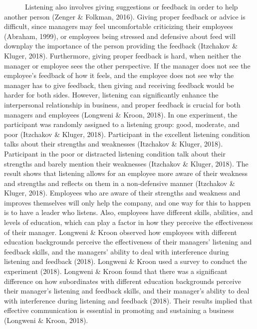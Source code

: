 \documentclass[
  12pt,
]{article}
\begin{document}
~~~~~~Listening also involves giving suggestions or feedback in order to help another person (Zenger \& Folkman, 2016). Giving proper feedback or advice is difficult, since managers may feel uncomfortable criticizing their employees (Abraham, 1999), or employees being stressed and defensive about feed will downplay the importance of the person providing the feedback (Itzchakov \& Kluger, 2018). Furthermore, giving proper feedback is hard, when neither the manager or employee sees the other perspective. If the manager does not see the employee's feedback of how it feels, and the employee does not see why the manager has to give feedback, then giving and receiving feedback would be harder for both sides. However, listening can significantly enhance the interpersonal relationship in business, and proper feedback is crucial for both managers and employees (Longweni \& Kroon, 2018). In one experiment, the participant was randomly assigned to a listening group: good, moderate, and poor (Itzchakov \& Kluger, 2018). Participant in the excellent listening condition talks about their strengths and weaknesses (Itzchakov \& Kluger, 2018). Participant in the poor or distracted listening condition talk about their strengths and barely mention their weaknesses (Itzchakov \& Kluger, 2018). The result shows that listening allows for an employee more aware of their weakness and strengths and reflects on them in a non-defensive manner (Itzchakov \& Kluger, 2018). Employees who are aware of their strengths and weakness and improves themselves will only help the company, and one way for this to happen is to have a leader who listens. Also, employees have different skills, abilities, and levels of education, which can play a factor in how they perceive the effectiveness of their manager. Longweni \& Kroon observed how employees with different education backgrounds perceive the effectiveness of their managers' listening and feedback skills, and the managers' ability to deal with interference during listening and feedback (2018). Longweni \& Kroon used a survey to conduct the experiment (2018). Longweni \& Kroon found that there was a significant difference on how subordinates with different education backgrounds perceive their manager's listening and feedback skills, and their manager's ability to deal with interference during listening and feedback (2018). Their results implied that effective communication is essential in promoting and sustaining a business (Longweni \& Kroon, 2018).
\end{document}
